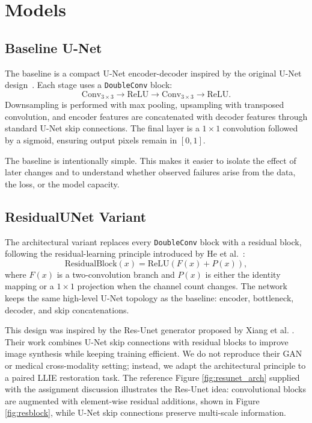 \documentclass[10pt,twocolumn]{article}
\begin{document}
\section{Models}
\subsection{Baseline U-Net}
The baseline is a compact U-Net encoder-decoder inspired by the original U-Net design~\cite{ronneberger2015unet}. Each stage uses a \texttt{DoubleConv} block:
\[
\mathrm{Conv}_{3 \times 3} \rightarrow \mathrm{ReLU} \rightarrow
\mathrm{Conv}_{3 \times 3} \rightarrow \mathrm{ReLU}.
\]
Downsampling is performed with max pooling, upsampling with transposed convolution, and encoder features are concatenated with decoder features through standard U-Net skip connections. The final layer is a $1 \times 1$ convolution followed by a sigmoid, ensuring output pixels remain in $[0,1]$.

The baseline is intentionally simple. This makes it easier to isolate the effect of later changes and to understand whether observed failures arise from the data, the loss, or the model capacity.

\subsection{ResidualUNet Variant}
The architectural variant replaces every \texttt{DoubleConv} block with a residual block, following the residual-learning principle introduced by He et al.~\cite{he2016resnet}:
\[
\mathrm{ResidualBlock}(x) =
\mathrm{ReLU}(F(x) + P(x)),
\]
where $F(x)$ is a two-convolution branch and $P(x)$ is either the identity mapping or a $1 \times 1$ projection when the channel count changes. The network keeps the same high-level U-Net topology as the baseline: encoder, bottleneck, decoder, and skip concatenations.

This design was inspired by the Res-Unet generator proposed by Xiang et al. \cite{xiang2018resunet}. Their work combines U-Net skip connections with residual blocks to improve image synthesis while keeping training efficient. We do not reproduce their GAN or medical cross-modality setting; instead, we adapt the architectural principle to a paired LLIE restoration task. The reference Figure \ref{fig:resunet_arch} supplied with the assignment discussion illustrates the Res-Unet idea: convolutional blocks are augmented with element-wise residual additions, shown in Figure \ref{fig:resblock}, while U-Net skip connections preserve multi-scale information.
\end{document}
